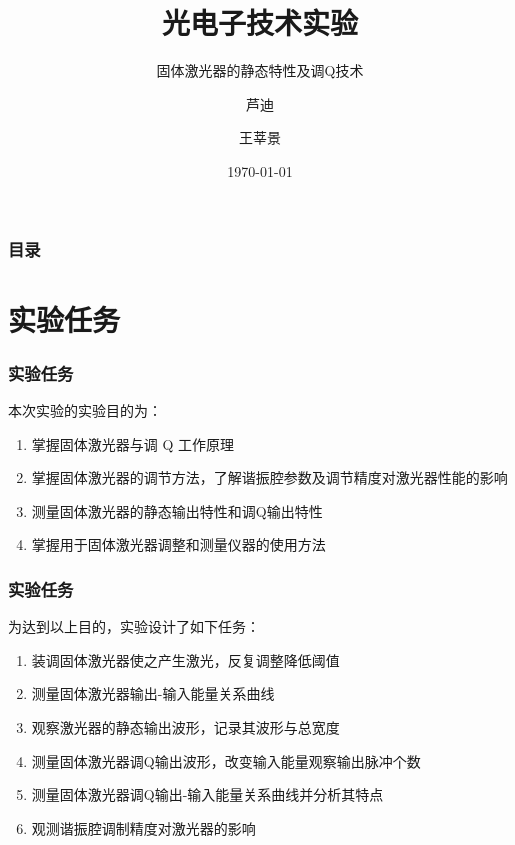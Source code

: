 \documentclass{beamer}
\title[光电中期报告] %
{光电子技术实验}
\subtitle{固体激光器的静态特性及调Q技术}
\author[芦, 王] %
{芦迪 \and 王莘景}
\institute[THU, EE] %
{

  Department of Electronic Engineering\\
  Tsinghua University
}
\date[2017.11.7] %
{\today}
\begin{document}
\frame{\titlepage}


\begin{frame}
\frametitle{目录}
\tableofcontents
\end{frame}


\section{实验任务}

\begin{frame}
\frametitle{实验任务}

本次实验的实验目的为：
\begin{enumerate}
  \item 掌握固体激光器与调 Q 工作原理
  \item 掌握固体激光器的调节方法，了解谐振腔参数及调节精度对激光器性能的影响
  \item 测量固体激光器的静态输出特性和调Q输出特性
  \item 掌握用于固体激光器调整和测量仪器的使用方法
\end{enumerate}
\end{frame}

\begin{frame}
  \frametitle{实验任务}
为达到以上目的，实验设计了如下任务： \\

\begin{enumerate}
    \item 装调固体激光器使之产生激光，反复调整降低阈值
    \item 测量固体激光器输出-输入能量关系曲线
    \item 观察激光器的静态输出波形，记录其波形与总宽度
    \item 测量固体激光器调Q输出波形，改变输入能量观察输出脉冲个数
    \item 测量固体激光器调Q输出-输入能量关系曲线并分析其特点
    \item 观测谐振腔调制精度对激光器的影响
\end{enumerate}
\end{frame}



\end{document}
